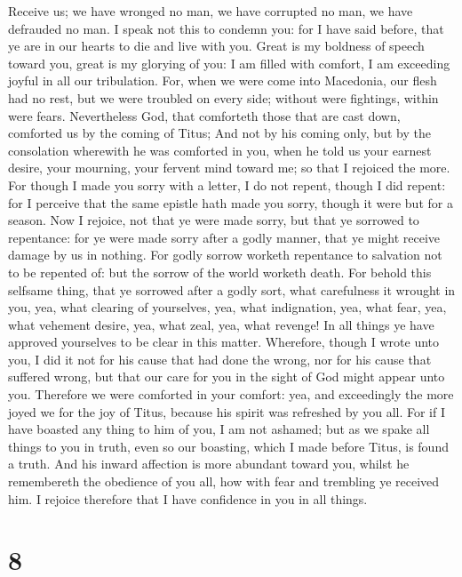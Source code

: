  Receive us; we have wronged no man, we have corrupted no
man, we have defrauded no man.  I speak not this to
condemn you: for I have said before, that ye are in our hearts to die
and live with you.  Great is my boldness of speech toward
you, great is my glorying of you: I am filled with comfort, I am
exceeding joyful in all our tribulation.  For, when we
were come into Macedonia, our flesh had no rest, but we were troubled on
every side; without were fightings, within were fears. 
Nevertheless God, that comforteth those that are cast down, comforted us
by the coming of Titus;  And not by his coming only, but
by the consolation wherewith he was comforted in you, when he told us
your earnest desire, your mourning, your fervent mind toward me; so that
I rejoiced the more.  For though I made you sorry with a
letter, I do not repent, though I did repent: for I perceive that the
same epistle hath made you sorry, though it were but for a season.
 Now I rejoice, not that ye were made sorry, but that ye
sorrowed to repentance: for ye were made sorry after a godly manner,
that ye might receive damage by us in nothing.  For godly
sorrow worketh repentance to salvation not to be repented of: but the
sorrow of the world worketh death.  For behold this
selfsame thing, that ye sorrowed after a godly sort, what carefulness it
wrought in you, yea, what clearing of yourselves, yea, what indignation,
yea, what fear, yea, what vehement desire, yea, what zeal, yea, what
revenge! In all things ye have approved yourselves to be clear in this
matter.  Wherefore, though I wrote unto you, I did it not
for his cause that had done the wrong, nor for his cause that suffered
wrong, but that our care for you in the sight of God might appear unto
you.  Therefore we were comforted in your comfort: yea,
and exceedingly the more joyed we for the joy of Titus, because his
spirit was refreshed by you all.  For if I have boasted
any thing to him of you, I am not ashamed; but as we spake all things to
you in truth, even so our boasting, which I made before Titus, is found
a truth.  And his inward affection is more abundant
toward you, whilst he remembereth the obedience of you all, how with
fear and trembling ye received him.  I rejoice therefore
that I have confidence in you in all things.

\hypertarget{section-7}{%
\section{8}\label{section-7}}

